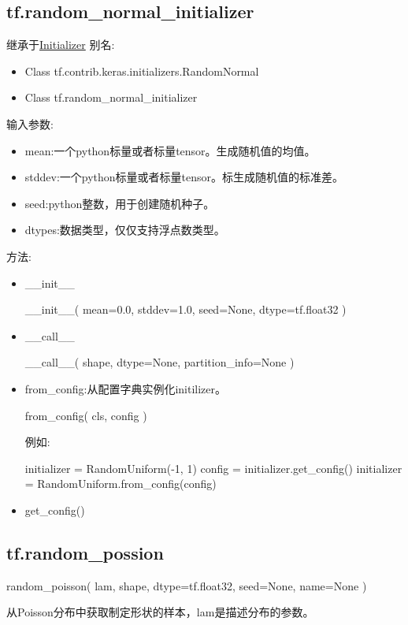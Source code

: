 \subsection{\textbf{tf.random\_normal\_initializer}}
继承于\href{https://www.tensorflow.org/api_docs/python/tf/contrib/keras/initializers/Initializer}{Initializer}
别名:
\begin{itemize}
\item Class tf.contrib.keras.initializers.RandomNormal
\item Class tf.random\_normal\_initializer
\end{itemize}
输入参数:
\begin{itemize}
\item mean:一个python标量或者标量tensor。生成随机值的均值。
\item stddev:一个python标量或者标量tensor。标生成随机值的标准差。
\item seed:python整数，用于创建随机种子。
\item dtypes:数据类型，仅仅支持浮点数类型。
\end{itemize}
方法:
\begin{itemize}
\item \_\_init\_\_
\begin{python}
__init__(
    mean=0.0,
    stddev=1.0,
    seed=None,
    dtype=tf.float32
)
\end{python}
\item \_\_call\_\_
\begin{python}
__call__(
    shape,
    dtype=None,
    partition_info=None
)
\end{python}
\item from\_config:从配置字典实例化initilizer。
\begin{python}
from_config(
    cls,
    config
)
\end{python}
例如:
\begin{python}
initializer = RandomUniform(-1, 1)
config = initializer.get_config()
initializer = RandomUniform.from_config(config)
\end{python}
\item get\_config()
\end{itemize}
\subsection{tf.random\_possion}
\begin{python}
random_poisson(
    lam,
    shape,
    dtype=tf.float32,
    seed=None,
    name=None
)
\end{python}
从Poisson分布中获取制定形状的样本，lam是描述分布的参数。

